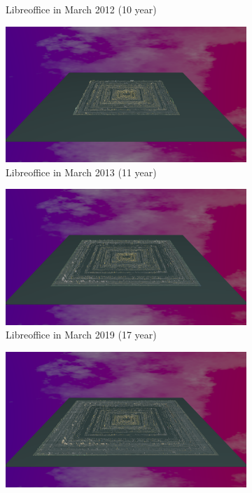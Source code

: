 \begin{figure}[h!]
\begin{subfigure}{0.48\textwidth}
        \caption{Libreoffice in March 2012 (10 year)} 
        \label{fig:Libre_V6_S3}
    \end{subfigure}\hspace*{\fill}
    \begin{subfigure}{0.48\textwidth}
        \includegraphics[width=\linewidth]{Libreoffice/Animation011.png}
        \caption{Libreoffice in March 2013 (11 year)} 
        \label{fig:Libre_V6_S4}
    \end{subfigure}
    \medskip
    \begin{subfigure}{0.48\textwidth}
        \includegraphics[width=\linewidth]{Libreoffice/Animation017.png}
        \caption{Libreoffice in March 2019 (17 year)} 
        \label{fig:Libre_V6_S5}
    \end{subfigure}\hspace*{\fill}
    \begin{subfigure}{0.48\textwidth}
        \includegraphics[width=\linewidth]{Libreoffice/Animation021.png}

\end{subfigure}
\end{figure}
